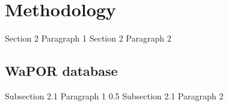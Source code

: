 \documentclass{article}%
\begin{document}
%
\newpage%
\RaggedRight%
\section{Methodology}%
\label{sec:Methodology}%
Section 2 Paragraph 1%
\linebreak%
Section 2 Paragraph 2%
\linebreak%
\subsection{WaPOR database}%
\label{subsec:WaPORdatabase}%
Subsection 2.1 Paragraph 1 0.5%
\linebreak%
Subsection 2.1 Paragraph 2%
\linebreak

%
\end{document}
